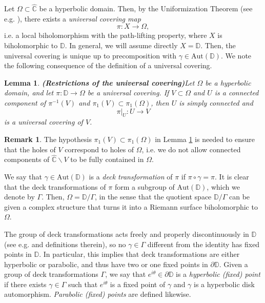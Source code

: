 \documentclass[11pt,a4paper,reqno]{amsart}
\theoremstyle{plain}
\newtheorem{lemma}[thm]{Lemma}
\theoremstyle{definition}
\newtheorem{obs}[thm]{Remark}
\theoremstyle{plain}
\def\Chat{\widehat{\mathbb{C}}}
\def\DD{\mathbb{D}}
\renewcommand{\setminus}{\smallsetminus}
\begin{document}
Let $ \Omega\subset\Chat $ be a hyperbolic domain. Then, by the Uniformization Theorem (see e.g. \cite[Thm. 1.6.5]{Aba23}), there exists a {\em universal covering map}\[\pi\colon X\to \Omega,\] i.e. a local biholomorphism with the path-lifting property, where $ X $ is biholomorphic to $ \mathbb{D} $. In general, we will assume directly $ X=\mathbb{D} $. Then, the universal covering is unique up to precomposition with $ \gamma\in\textrm{Aut}(\mathbb{D}) $. We note the following consequence of the definition of a universal covering.

\begin{lemma}{\bf (Restrictions of the universal covering)}\label{lem:restriction}
	Let $ \Omega $ be a hyperbolic domain, and let $ \pi\colon\mathbb{D}\to \Omega $ be a universal covering. If $ V\subset \Omega $ and $ U $ is a connected component of $ \pi^{-1}(V) $ and $\pi_1(V)\subset \pi_1(\Omega)$, then $ U $ is simply connected and
	\[\pi|_U\colon U\to V\] is a universal covering of $ V $.
\end{lemma}
\begin{obs}
The hypothesis $\pi_1(V)\subset\pi_1(\Omega)$ in Lemma \ref{lem:restriction} is needed to ensure that the  holes of  $V$ correspond to holes of $ \Omega $, i.e. we do not allow connected components of $\Chat\setminus V$  to be fully contained in $\Omega$.
\end{obs}

We say that $ \gamma\in \textrm{Aut}(\mathbb{D}) $ is a {\em deck transformation} of $ \pi $ if $ \pi\circ\gamma =\pi $. It is clear that the deck transformations of $ \pi $ form a subgroup of $ \textrm{Aut}(\mathbb{D}) $, which we denote by $ \Gamma $. Then, $ \Omega=\mathbb{D}/ \Gamma $, in the sense that the quotient space $\DD/\Gamma$ can be given a complex structure that turns it into a Riemann surface biholomorphic to $\Omega$.

The group of deck transformations acts freely and properly discontinuously in $ \mathbb{D} $ (see e.g. \cite[Sect. 1.6]{Aba23} and definitions therein), so no  $ \gamma\in \Gamma$ different from the identity has fixed points in $ \mathbb{D} $. In particular, this implies that deck transformations are either hyperbolic  or parabolic, and thus have two or one fixed points in $ \partial\mathbb{D} $. Given a group of deck transformations $ \Gamma $, we say that $ e^{i\theta}\in\partial \mathbb{D} $ is a {\em hyperbolic  (fixed) point} if there exists $ \gamma\in\Gamma $ such that $ e^{i\theta} $ is a fixed point of $ \gamma $ and $\gamma$ is a hyperbolic disk automorphism. {\em Parabolic (fixed) points} are defined likewise.
\end{document}
